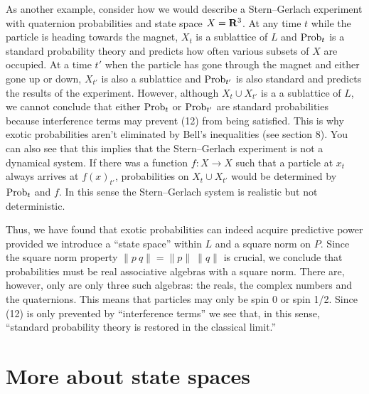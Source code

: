 \documentclass[12pt]{article}
\begin{document}
As another example, consider how we would describe a Stern--Gerlach 
experiment with quaternion probabilities and state space $X={\bf R}^3$.  At 
any time $t$ while the particle is heading towards the magnet, $X_t$ 
is a sublattice of $L$ and ${\rm Prob}_t$ is a standard probability theory
and predicts how often various subsets of $X$ are occupied.  
At a time $t'$ when the particle
has gone through the magnet and either gone up or down, $X_{t'}$ is 
also a sublattice and ${\rm Prob}_{t'}$ is also standard and predicts the
results of the experiment.  However, although $X_t\cup X_{t'}$ is a
a sublattice of $L$, we cannot conclude that either ${\rm Prob}_t$ or ${\rm Prob}_{t'}$
are standard probabilities because interference terms may prevent
(12) from being satisfied.  This is why exotic probabilities aren't 
eliminated by Bell's inequalities (see section 8).  
You can also see that this implies that the Stern--Gerlach experiment
is not a dynamical system.  If there was a function $f:X\rightarrow X$
such that a particle at $x_t$ always arrives at $f(x)_{t'}$, probabilities on
$X_{t}\cup X_{t'}$ would be determined by ${\rm Prob}_t$ and $f$.  In this
sense the Stern--Gerlach system is realistic but not deterministic.

Thus, we have found that exotic probabilities
can indeed acquire predictive power provided we introduce a ``state space''
within $L$ and a square norm on $P$.  Since the square norm
property $\parallel p\ q\parallel=\parallel p\parallel\ \parallel q\parallel$
is crucial, we conclude that probabilities must be
real associative algebras with a square norm. There are, however, only 
are only three such algebras: the reals, the complex numbers and the 
quaternions\cite{harvey}.  This means that particles may only be spin 0 or spin 1/2.
Since (12) is only prevented by ``interference terms'' we see that, in this sense,
``standard probability theory is restored in the classical limit.''

\section{More about state spaces}
\end{document}
